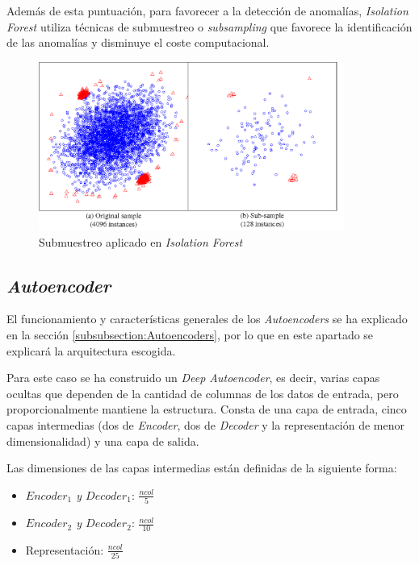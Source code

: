 Además de esta puntuación, para favorecer a la detección de anomalías, \textit{Isolation Forest} utiliza técnicas de submuestreo o \textit{subsampling} que favorece la identificación de las anomalías y disminuye el coste computacional.

\begin{figure}[h]
    \centering
    \includegraphics[width=10cm]{figs/subsample.png}
    \caption{Submuestreo aplicado en \textit{Isolation Forest}}
    \label{fig:subsample}
\end{figure}

\subsection{\textit{Autoencoder}}

El funcionamiento y características generales de los \textit{Autoencoders} se ha explicado en la sección \ref{subsubsection:Autoencoders}, por lo que en este apartado se explicará la arquitectura escogida.

Para este caso se ha construido un \textit{Deep Autoencoder}, es decir, varias capas ocultas que dependen de la cantidad de columnas de los datos de entrada, pero proporcionalmente mantiene la estructura. Consta de una capa de entrada, cinco capas intermedias (dos de \textit{Encoder}, dos de \textit{Decoder} y la representación de menor dimensionalidad) y una capa de salida.

Las dimensiones de las capas intermedias están definidas de la siguiente forma:
\begin{itemize}
    \item \textit{\(Encoder_1\) y \(Decoder_1\)}: \(\frac{ncol}{5}\)
    \item \textit{\(Encoder_2\) y \(Decoder_2\)}: \(\frac{ncol}{10}\)
    \item Representación: \(\frac{ncol}{25}\)
\end{itemize}

